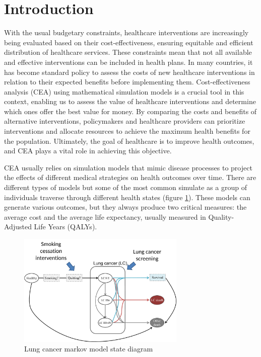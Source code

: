 \documentclass{IOS-Book-Article}
\def\hb{\hbox to 11.5 cm{}}
\begin{document}
	\markboth{April 2023\hb}{April 2023\hb}
	
	\section{Introduction}
	With the usual budgetary constraints, healthcare interventions are increasingly being evaluated based on their cost-effectiveness, ensuring equitable and efficient distribution of healthcare services. These constraints mean that not all available and effective interventions can be included in health plans. In many countries, it has become standard policy to assess the costs of new healthcare interventions in relation to their expected benefits before implementing them. Cost-effectiveness analysis (CEA) using mathematical simulation models is a crucial tool in this context, enabling us to assess the value of healthcare interventions and determine which ones offer the best value for money. By comparing the costs and benefits of alternative interventions, policymakers and healthcare providers can prioritize interventions and allocate resources to achieve the maximum health benefits for the population. Ultimately, the goal of healthcare is to improve health outcomes, and CEA plays a vital role in achieving this objective\cite{polaris}.

	CEA usually relies on simulation models that mimic disease processes to project the effects of different medical strategies on health outcomes over time. There are different types of models but some of the most common simulate as a group of individuals traverse through different health states (figure \ref{fig:lung_model}). These models can generate various outcomes, but they always produce two critical measures: the average cost and the average life expectancy, usually measured in Quality-Adjusted Life Years (QALYs).
				
	\begin{figure}[h!]
		\centering	
		\includegraphics[width=80mm]{figs/lungmodel.pdf}		
		\caption{Lung cancer markov model state diagram}	
		\label{fig:lung_model}	
	\end{figure}
		
\end{document}
